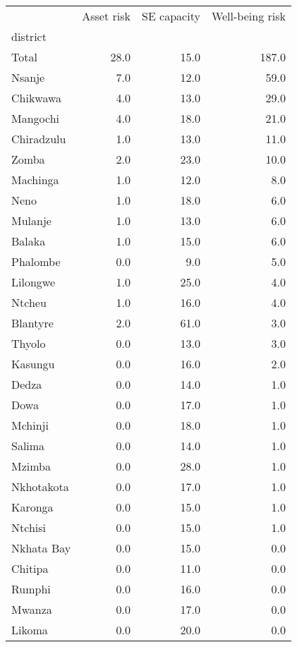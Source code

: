 \begin{tabular}{lrrr}
\toprule
{} &  Asset risk &  SE capacity &  Well-being risk \\
district   &             &              &                  \\
\midrule
Total      &        28.0 &         15.0 &            187.0 \\
Nsanje     &         7.0 &         12.0 &             59.0 \\
Chikwawa   &         4.0 &         13.0 &             29.0 \\
Mangochi   &         4.0 &         18.0 &             21.0 \\
Chiradzulu &         1.0 &         13.0 &             11.0 \\
Zomba      &         2.0 &         23.0 &             10.0 \\
Machinga   &         1.0 &         12.0 &              8.0 \\
Neno       &         1.0 &         18.0 &              6.0 \\
Mulanje    &         1.0 &         13.0 &              6.0 \\
Balaka     &         1.0 &         15.0 &              6.0 \\
Phalombe   &         0.0 &          9.0 &              5.0 \\
Lilongwe   &         1.0 &         25.0 &              4.0 \\
Ntcheu     &         1.0 &         16.0 &              4.0 \\
Blantyre   &         2.0 &         61.0 &              3.0 \\
Thyolo     &         0.0 &         13.0 &              3.0 \\
Kasungu    &         0.0 &         16.0 &              2.0 \\
Dedza      &         0.0 &         14.0 &              1.0 \\
Dowa       &         0.0 &         17.0 &              1.0 \\
Mchinji    &         0.0 &         18.0 &              1.0 \\
Salima     &         0.0 &         14.0 &              1.0 \\
Mzimba     &         0.0 &         28.0 &              1.0 \\
Nkhotakota &         0.0 &         17.0 &              1.0 \\
Karonga    &         0.0 &         15.0 &              1.0 \\
Ntchisi    &         0.0 &         15.0 &              1.0 \\
Nkhata Bay &         0.0 &         15.0 &              0.0 \\
Chitipa    &         0.0 &         11.0 &              0.0 \\
Rumphi     &         0.0 &         16.0 &              0.0 \\
Mwanza     &         0.0 &         17.0 &              0.0 \\
Likoma     &         0.0 &         20.0 &              0.0 \\
\bottomrule
\end{tabular}
